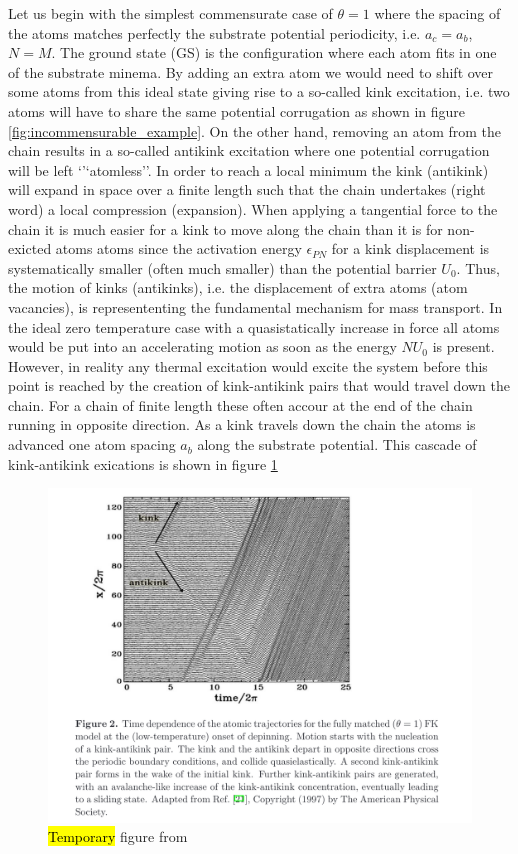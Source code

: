 Let us begin with the simplest commensurate case of $\theta = 1$ where the
spacing of the atoms matches perfectly the substrate potential periodicity, i.e.
$a_c = a_b$, $N = M$. The ground state (GS) is the configuration where each atom
fits in one of the substrate minema. By adding an extra atom we would need to
shift over some atoms from this ideal state giving rise to a so-called kink
excitation, i.e. two atoms will have to share the same potential corrugation as
shown in figure \ref{fig:incommensurable_example}.  On the other hand, removing an atom from the chain results in a so-called antikink excitation where one potential corrugation will be left `'`atomless''. In order to reach a local minimum the kink
(antikink) will expand in space over a finite length such that the chain undertakes (right word) a local compression (expansion). When applying a tangential force to the
chain it is much easier for a kink to move along the chain than it is for non-exicted atoms atoms since the activation energy $\epsilon_{PN}$ for a kink displacement is
systematically smaller (often much smaller) than the potential barrier $U_0$.
Thus, the motion of kinks (antikinks), i.e. the displacement of extra atoms
(atom vacancies), is represententing the fundamental mechanism for mass transport. In
the ideal zero temperature case with a quasistatically increase in
force all atoms would be put into an accelerating motion as soon as the energy
$NU_0$ is present. However, in reality any thermal excitation would excite the
system before this point is reached by the creation of kink-antikink pairs that would travel down the chain. For a chain of finite length these often accour at the end of the chain running in opposite direction. As a kink travels down the chain the atoms is advanced one atom spacing $a_b$ along the substrate potential.  This cascade of kink-antikink exications is shown in figure \ref{fig:kink_antikink}


\begin{figure}[H]
  \centering
  \includegraphics[width=0.8\linewidth]{figures/theory/kink_antikink.png}
  \caption{\hl{Temporary} figure from \cite{Manini_2016}}
  \label{fig:kink_antikink}
\end{figure}


